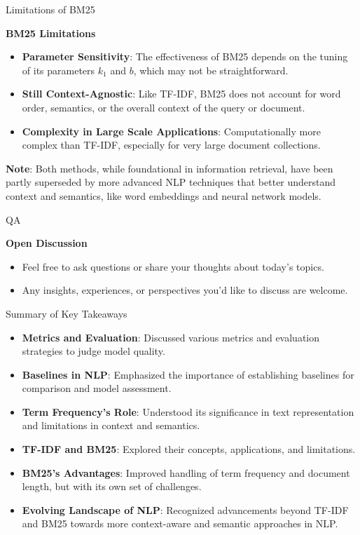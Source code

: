 \documentclass{beamer}
\begin{document}
\begin{frame}{Limitations of BM25}

\textbf{BM25 Limitations}
\begin{itemize}
  \item \textbf{Parameter Sensitivity}: The effectiveness of BM25 depends on the tuning of its parameters \( k_1 \) and \( b \), which may not be straightforward.
  \item \textbf{Still Context-Agnostic}: Like TF-IDF, BM25 does not account for word order, semantics, or the overall context of the query or document.
  \item \textbf{Complexity in Large Scale Applications}: Computationally more complex than TF-IDF, especially for very large document collections.
\end{itemize}

\textbf{Note}: Both methods, while foundational in information retrieval, have been partly superseded by more advanced NLP techniques that better understand context and semantics, like word embeddings and neural network models.

\end{frame}


\begin{frame}{QA}

\textbf{Open Discussion}
\begin{itemize}
  \item Feel free to ask questions or share your thoughts about today's topics.
  \item Any insights, experiences, or perspectives you'd like to discuss are welcome.
\end{itemize}

\end{frame}


\begin{frame}{Summary of Key Takeaways}

\begin{itemize}
  \item \textbf{Metrics and Evaluation}: Discussed various metrics and evaluation strategies to judge model quality.
  \item \textbf{Baselines in NLP}: Emphasized the importance of establishing baselines for comparison and model assessment.
  \item \textbf{Term Frequency's Role}: Understood its significance in text representation and limitations in context and semantics.
  \item \textbf{TF-IDF and BM25}: Explored their concepts, applications, and limitations.
  \item \textbf{BM25's Advantages}: Improved handling of term frequency and document length, but with its own set of challenges.
  \item \textbf{Evolving Landscape of NLP}: Recognized advancements beyond TF-IDF and BM25 towards more context-aware and semantic approaches in NLP.
\end{itemize}

\end{frame}
\end{document}
